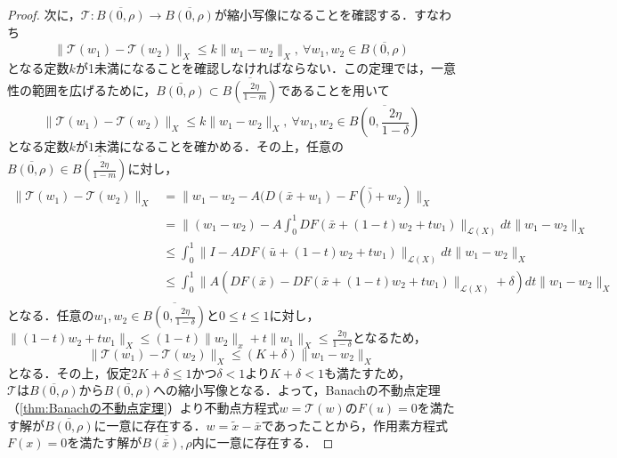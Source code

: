 \documentclass[11pt,a4paper,titlepage]{jsreport}
\theoremstyle{definition}
\begin{document}
\begin{proof}
  次に，$\mathcal{T}:\overline{B(0,\rho)}\rightarrow \overline{B(0,\rho)}$が縮小写像になることを確認する．すなわち
  \begin{equation*}
    \|\mathcal{T}(w_1) - \mathcal{T} (w_2)\|_X \leq k \|w_1-w_2\|_X,\ \forall w_1,w_2\in \overline{B(0,\rho)}
  \end{equation*}
  となる定数$k$が1未満になることを確認しなければならない．この定理では，一意性の範囲を広げるために，$\overline{B(0,\rho)}\subset \overline{B\left(\frac{2\eta}{1-m}\right)}$であることを用いて
  \begin{equation*}
    \|\mathcal{T}(w_1) - \mathcal{T} (w_2)\|_X \leq k \|w_1-w_2\|_X,\ \forall w_1,w_2\in \overline{B\left(0,\frac{2\eta}{1-\delta}\right)}
  \end{equation*}
  となる定数$k$が$1$未満になることを確かめる．その上，任意の$\overline{B(0,\rho)}\in\overline{B\left(\frac{2\eta}{1-m}\right)}$に対し，
  \begin{align*}
    \|\mathcal{T}(w_1) - \mathcal{T} (w_2)\|_X & = \|w_1-w_2-A(D(\bar{x}+w_1)-F(\bar)+w_2)\|_X                                                         \\
                                               & = \|(w_1-w_2)-A\int_{0}^{1}DF(\bar{x}+(1-t)w_2+tw_1)\|_{\mathcal{L}(X)}dt\|w_1-w_2\|_X                \\
                                               & \leq \int_{0}^{1} \|I-ADF(\bar{u}+(1-t)w_2+tw_1)\|_{\mathcal{L}(X)}dt\|w_1-w_2\|_X                    \\
                                               & \leq \int_{0}^{1} \|A(DF(\bar{x})-DF(\bar{x}+(1-t)w_2+tw_1)\|_{\mathcal{L}(X)}+\delta)dt\|w_1-w_2\|_X \\
  \end{align*}
  となる．任意の$w_1,w_2\in\overline{B\left(0,\frac{2\eta}{1-\delta}\right)}$と$0\leq t \leq 1$に対し，$\|(1-t)w_2+tw_1\|_X\leq(1-t)\|w_2\|_x+t\|w_1\|_X\leq \frac{2\eta}{1-\delta}$となるため，
  \begin{equation*}
    \|\mathcal{T}(w_1) - \mathcal{T} (w_2)\|_X \leq (K+\delta)\|w_1-w_2\|_X
  \end{equation*}
  となる．その上，仮定$2K+\delta\leq 1かつ\delta<1$より$K+\delta < 1$も満たすため，$\mathcal{T}は\overline{B(0,\rho)}から\overline{B(0,\rho)}$への縮小写像となる．よって，Banachの不動点定理（\ref{thm:Banachの不動点定理}）より不動点方程式$w=\mathcal{T}(w)$の$F(u)=0$を満たす解が$\overline{B(0,\rho)}$に一意に存在する．$w=\tilde{x}-\bar{x}$であったことから，作用素方程式$F(x)=0$を満たす解が$\overline{B(\bar{x}),\rho}$内に一意に存在する．


\end{proof}
\end{document}
